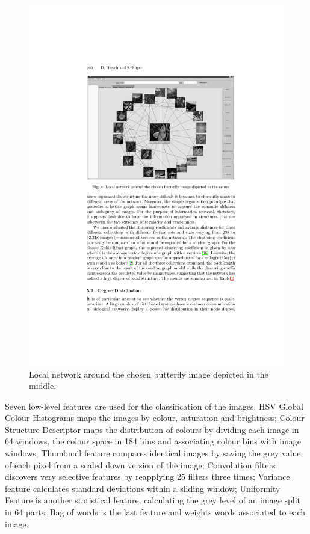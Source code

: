 \begin{figure}[ht]
	\centering
		\includegraphics[scale=1]{imgs-RelatedWork/Heesch-2004p2675}
	\caption{Local network around the chosen butterfly image depicted in the middle.}
	\label{fig:heesch1}
\end{figure}

Seven low-level features are used for the classification of the images. HSV Global Colour Histograms maps the images by colour, saturation and brightness; Colour Structure Descriptor maps the distribution of colours by dividing each image in 64 windows, the colour space in 184 bins and associating colour bins with image windows; Thumbnail feature compares identical images by saving the grey value of each pixel from a scaled down version of the image; Convolution filters discovers very selective features by reapplying 25 filters three times; Variance feature calculates standard deviations within a sliding window; Uniformity Feature is another statistical feature, calculating the grey level of an image split in 64 parts; Bag of words is the last feature and weights words associated to each image.


